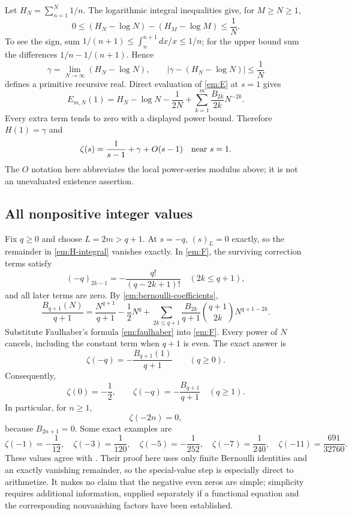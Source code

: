 Let $H_N=\sum_{n=1}^N1/n$.  The logarithmic integral inequalities give,
for $M\geq N\geq1$,
\[
 0\leq(H_N-\log N)-(H_M-\log M)\leq\frac1N.
\]
To see the sign, sum
$1/(n+1)\leq\int_n^{n+1}dx/x\leq1/n$; for the upper bound sum the
differences $1/n-1/(n+1)$.  Hence
\begin{equation}
 \gamma=\lim_{N\to\infty}(H_N-\log N),\qquad
 |\gamma-(H_N-\log N)|\leq\frac1N
 \label{em:gamma-name}
\end{equation}
defines a primitive recursive real.  Direct evaluation of
\eqref{em:E} at $s=1$ gives
\begin{equation}
 E_{m,N}(1)=H_N-\log N-\frac1{2N}
              +\sum_{k=1}^m\frac{B_{2k}}{2k}N^{-2k}.
 \label{em:gamma-identification}
\end{equation}
Every extra term tends to zero with a displayed power bound.  Therefore
$H(1)=\gamma$ and
\begin{equation}
 \zeta(s)=\frac1{s-1}+\gamma+O(s-1)
 \quad\hbox{near }s=1.
 \label{em:laurent-first}
\end{equation}
The $O$ notation here abbreviates the local power-series modulus above;
it is not an unevaluated existence assertion.

\subsection{All nonpositive integer values}

Fix $q\geq0$ and choose $L=2m>q+1$.  At $s=-q$, $(s)_L=0$ exactly,
so the remainder in \eqref{em:H-integral} vanishes exactly.  In
\eqref{em:F}, the surviving correction terms satisfy
\[
 (-q)_{2k-1}=-\frac{q!}{(q-2k+1)!}
          \quad(2k\leq q+1),
\]
and all later terms are zero.  By
\eqref{em:bernoulli-coefficients},
\[
 \frac{B_{q+1}(N)}{q+1}
 =\frac{N^{q+1}}{q+1}-\frac12N^q+
   \sum_{2k\leq q+1}\frac{B_{2k}}{q+1}
                    \binom{q+1}{2k}N^{q+1-2k}.
\]
Substitute Faulhaber's formula \eqref{em:faulhaber} into
\eqref{em:F}.  Every power of $N$ cancels, including the constant term
when $q+1$ is even.  The exact answer is
\begin{equation}
 \zeta(-q)=-\frac{B_{q+1}(1)}{q+1}\qquad(q\geq0).
 \label{em:negative-unified}
\end{equation}
Consequently,
\begin{equation}
 \zeta(0)=-\frac12,\qquad
 \zeta(-q)=-\frac{B_{q+1}}{q+1}\quad(q\geq1).
 \label{em:negative}
\end{equation}
In particular, for $n\geq1$,
\begin{equation}
 \zeta(-2n)=0,
 \label{em:trivial-zeros}
\end{equation}
because $B_{2n+1}=0$.  Some exact examples are
\[
 \zeta(-1)=-\frac1{12},\quad
 \zeta(-3)=\frac1{120},\quad
 \zeta(-5)=-\frac1{252},\quad
 \zeta(-7)=\frac1{240},\quad
 \zeta(-11)=\frac{691}{32760}.
\]
These values agree with \cite{DLMF25_6}.  Their proof here uses only
finite Bernoulli identities and an exactly vanishing remainder, so the
special-value step is especially direct to arithmetize.  It makes no
claim that the negative even zeros are simple; simplicity requires
additional information, supplied separately if a functional equation
and the corresponding nonvanishing factors have been established.

